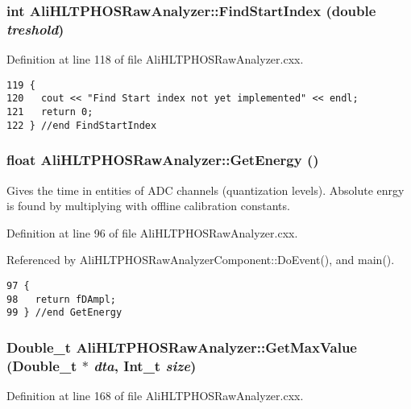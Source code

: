 \subsubsection{\setlength{\rightskip}{0pt plus 5cm}int Ali\-HLTPHOSRaw\-Analyzer::Find\-Start\-Index (double {\em treshold})}\label{classAliHLTPHOSRawAnalyzer_a7}




Definition at line 118 of file Ali\-HLTPHOSRaw\-Analyzer.cxx.

\footnotesize\begin{verbatim}119 {
120   cout << "Find Start index not yet implemented" << endl;
121   return 0;
122 } //end FindStartIndex
\end{verbatim}\normalsize 


\subsubsection{\setlength{\rightskip}{0pt plus 5cm}float Ali\-HLTPHOSRaw\-Analyzer::Get\-Energy ()}\label{classAliHLTPHOSRawAnalyzer_a9}


Gives the time in entities of ADC channels (quantization levels). Absolute enrgy is found by multiplying with offline calibration constants. 

Definition at line 96 of file Ali\-HLTPHOSRaw\-Analyzer.cxx.

Referenced by Ali\-HLTPHOSRaw\-Analyzer\-Component::Do\-Event(), and main().

\footnotesize\begin{verbatim}97 {
98   return fDAmpl;
99 } //end GetEnergy
\end{verbatim}\normalsize 


\subsubsection{\setlength{\rightskip}{0pt plus 5cm}Double\_\-t Ali\-HLTPHOSRaw\-Analyzer::Get\-Max\-Value (Double\_\-t $\ast$ {\em dta}, Int\_\-t {\em size})}\label{classAliHLTPHOSRawAnalyzer_a18}




Definition at line 168 of file Ali\-HLTPHOSRaw\-Analyzer.cxx.

